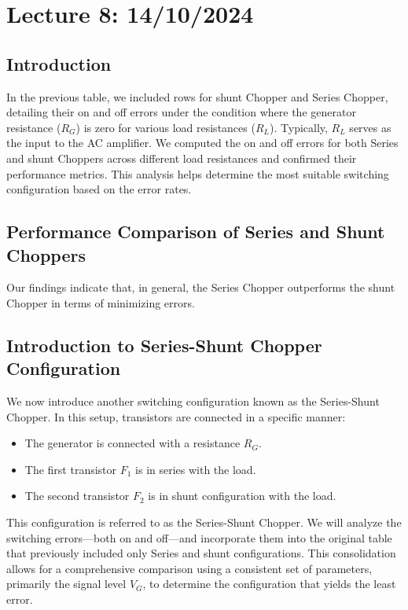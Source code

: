 \documentclass[a4paper,9pt,twoside,openany,twocolumn]{memoir}
\begin{document}
\section*{Lecture 8: 14/10/2024}

\subsection{Introduction}
In the previous table, we included rows for shunt Chopper and Series Chopper, detailing their on and off errors under the condition where the generator resistance (\( R_G \)) is zero for various load resistances (\( R_L \)). Typically, \( R_L \) serves as the input to the AC amplifier. We computed the on and off errors for both Series and shunt Choppers across different load resistances and confirmed their performance metrics. This analysis helps determine the most suitable switching configuration based on the error rates.

\subsection{Performance Comparison of Series and Shunt Choppers}
Our findings indicate that, in general, the Series Chopper outperforms the shunt Chopper in terms of minimizing errors. 

\subsection{Introduction to Series-Shunt Chopper Configuration}
We now introduce another switching configuration known as the Series-Shunt Chopper. In this setup, transistors are connected in a specific manner:
\begin{itemize}
    \item The generator is connected with a resistance \( R_G \).
    \item The first transistor \( F_1 \) is in series with the load.
    \item The second transistor \( F_2 \) is in shunt configuration with the load.
\end{itemize}
This configuration is referred to as the Series-Shunt Chopper. We will analyze the switching errors—both on and off—and incorporate them into the original table that previously included only Series and shunt configurations. This consolidation allows for a comprehensive comparison using a consistent set of parameters, primarily the signal level \( V_G \), to determine the configuration that yields the least error.
\end{document}

